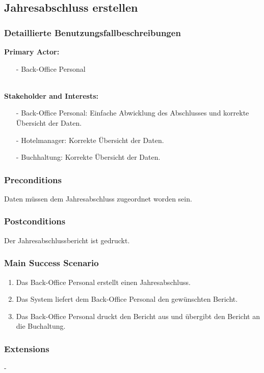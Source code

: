 \documentclass[./detailed_overview_usecases.tex]{subfiles}
\begin{document}
    \subsection{Jahresabschluss erstellen}
    \subsubsection{Detaillierte Benutzungsfallbeschreibungen}
    \textbf{Primary Actor: }
    \begin{itemize}
        \item[-] Back-Office Personal
    \end{itemize}
    \\
    \textbf{Stakeholder and Interests:}
    \begin{itemize}
        \item[-] Back-Office Personal: Einfache Abwicklung des Abschlusses und korrekte Übersicht der Daten.
        \item[-] Hotelmanager: Korrekte Übersicht der Daten.
        \item[-] Buchhaltung: Korrekte Übersicht der Daten.
    \end{itemize}

    \subsubsection*{Preconditions}
    Daten müssen dem Jahresabschluss zugeordnet worden sein.
    \subsubsection*{Postconditions}
    Der Jahresabschlussbericht ist gedruckt.

    \subsubsection*{Main Success Scenario}
    \begin{enumerate}
        \item Das Back-Office Personal erstellt einen Jahresabschluss.
        \item Das System liefert dem Back-Office Personal den gewünschten Bericht.
        \item Das Back-Office Personal druckt den Bericht aus und übergibt den Bericht an die Buchaltung.
    \end{enumerate}

    \subsubsection*{Extensions}
    -
\end{document}
